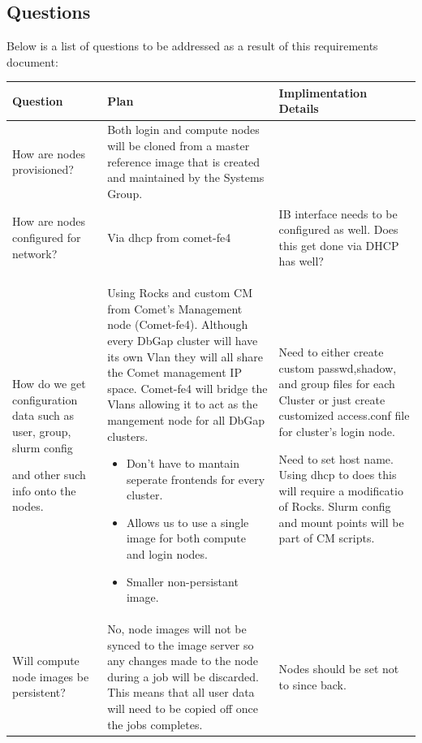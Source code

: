 \hypertarget{questions}{%
\subsection{Questions}\label{questions}}

Below is a list of questions to be addressed as a result of this
requirements document:

\begin{table}
\begin{tabular}{|p{4cm}|p{4cm}|p{4cm}|}
\toprule
\textbf{Question} & \textbf{Plan} & \textbf{Implimentation
Details}\\
\midrule

How are nodes provisioned?
 & 
Both login and compute nodes will be cloned from a master
reference image that is created and maintained by the Systems
Group.
 & 
~
\\
How are nodes configured for network?
 & 
Via dhcp from comet-fe4
 & 
IB interface needs to be configured as well.
Does this get done via DHCP has well?
\\

How do we get configuration data such as user, group, slurm config

and other such info onto the nodes.
 & 
Using Rocks and custom CM from Comet's Management node (Comet-fe4).
Although every
DbGap cluster will have its own Vlan they will all share the Comet
management IP space.
Comet-fe4 will bridge the Vlans allowing it to act as the mangement node for all DbGap clusters.

\begin{itemize}
\item
  Don't have to mantain seperate frontends for every cluster.
\item
  Allows us to use a single image for both compute and login nodes.
\item
  Smaller non-persistant image.
\end{itemize}
 & 
Need to either create custom passwd,shadow, and group files
for each Cluster or just create customized access.conf file for
cluster's login node.

Need to set host name. Using dhcp to does this will require a
modificatio of Rocks.
Slurm config and mount points will be part of CM scripts.
\\

Will compute node images be persistent?
 & 
No, node images will not be synced to the image server so any changes
made to the node during a job will be discarded. This means that all
user
data will need to be copied off once the jobs completes.
 & 
Nodes should be set not to since back.
\\


\end{tabular}
\end{table}
